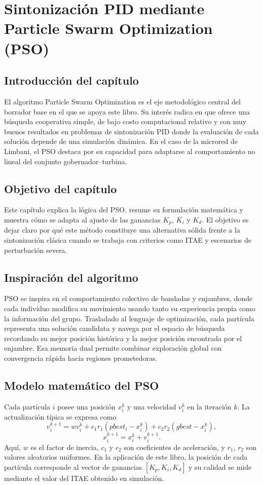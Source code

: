 \chapter{Sintonización PID mediante Particle Swarm Optimization (PSO)}
\label{ch:pso}

\section{Introducción del capítulo}
El algoritmo Particle Swarm Optimization es el eje metodológico central del borrador base en
el que se apoya este libro. Su interés radica en que ofrece una búsqueda cooperativa simple,
de bajo costo computacional relativo y con muy buenos resultados en problemas de
sintonización PID donde la evaluación de cada solución depende de una simulación dinámica.
En el caso de la microred de Limbani, el PSO destaca por su capacidad para adaptarse al
comportamiento no lineal del conjunto gobernador--turbina.

\section{Objetivo del capítulo}
Este capítulo explica la lógica del PSO, resume su formulación matemática y muestra cómo se
adapta al ajuste de las ganancias $K_p$, $K_i$ y $K_d$. El objetivo es dejar claro por qué este
método constituye una alternativa sólida frente a la sintonización clásica cuando se trabaja con
criterios como ITAE y escenarios de perturbación severa.

\section{Inspiración del algoritmo}
PSO se inspira en el comportamiento colectivo de bandadas y enjambres, donde cada
individuo modifica su movimiento usando tanto su experiencia propia como la información del
grupo. Trasladado al lenguaje de optimización, cada partícula representa una solución
candidata y navega por el espacio de búsqueda recordando su mejor posición histórica y la
mejor posición encontrada por el enjambre. Esa memoria dual permite combinar exploración
global con convergencia rápida hacia regiones prometedoras.

\section{Modelo matemático del PSO}
Cada partícula $i$ posee una posición $x_i^k$ y una velocidad $v_i^k$ en la iteración $k$. La
actualización típica se expresa como
\[
v_i^{k+1}=w v_i^k + c_1 r_1\left(pbest_i-x_i^k\right)+c_2 r_2\left(gbest-x_i^k\right),
\]
\[
x_i^{k+1}=x_i^k+v_i^{k+1}.
\]
Aquí, $w$ es el factor de inercia, $c_1$ y $c_2$ son coeficientes de aceleración, y $r_1$, $r_2$
son valores aleatorios uniformes. En la aplicación de este libro, la posición de cada partícula
corresponde al vector de ganancias $\left[K_p,K_i,K_d\right]$ y su calidad se mide mediante el
valor del ITAE obtenido en simulación.

